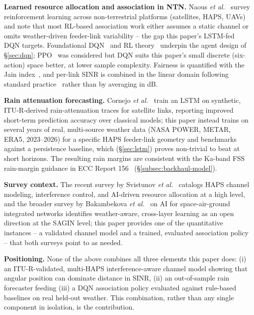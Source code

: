 \documentclass[]{ieeeaccess}
\begin{document}
\textbf{Learned resource allocation and association in NTN.} Naous \emph{et al.}~\cite{naous2023rlsky} survey reinforcement learning across non-terrestrial platforms (satellites, HAPS, UAVs) and note that most RL-based association work either assumes a static channel or omits weather-driven feeder-link variability -- the gap this paper's LSTM-fed DQN targets. Foundational DQN~\cite{mnih2015dqn} and RL theory~\cite{sutton2018rl} underpin the agent design of \S\ref{sec:dqn}; PPO~\cite{schulman2017ppo} was considered but DQN suits this paper's small discrete (six-action) space better, at lower sample complexity. Fairness is quantified with the Jain index~\cite{jain1984quantitative}, and per-link SINR is combined in the linear domain following standard practice~\cite{goldsmith2005} rather than by averaging in dB.

\textbf{Rain attenuation forecasting.} Cornejo \emph{et al.}~\cite{cornejo2022lstmrain} train an LSTM on synthetic, ITU-R-derived rain-attenuation traces for satellite links, reporting improved short-term prediction accuracy over classical models; this paper instead trains on several years of real, multi-source weather data (NASA POWER, METAR, ERA5, 2023--2026) for a specific HAPS feeder-link geometry and benchmarks against a persistence baseline, which (\S\ref{sec:lstm}) proves non-trivial to beat at short horizons. The resulting rain margins are consistent with the Ka-band FSS rain-margin guidance in ECC Report 156~\cite{ecc_report_156} (\S\ref{subsec:backhaul-model}).

\textbf{Survey context.} The recent survey by Svistunov \emph{et al.}~\cite{svistunov2025haps} catalogs HAPS channel modeling, interference control, and AI-driven resource allocation at a high level, and the broader survey by Bakambekova \emph{et al.}~\cite{bakambekova2024} on AI for space-air-ground integrated networks identifies weather-aware, cross-layer learning as an open direction at the SAGIN level; this paper provides one of the quantitative instances -- a validated channel model and a trained, evaluated association policy -- that both surveys point to as needed.

\textbf{Positioning.} None of the above combines all three elements this paper does: (i) an ITU-R-validated, multi-HAPS interference-aware channel model showing that angular position can dominate distance in SINR, (ii) an out-of-sample rain forecaster feeding (iii) a DQN association policy evaluated against rule-based baselines on real held-out weather. This combination, rather than any single component in isolation, is the contribution.
\end{document}

